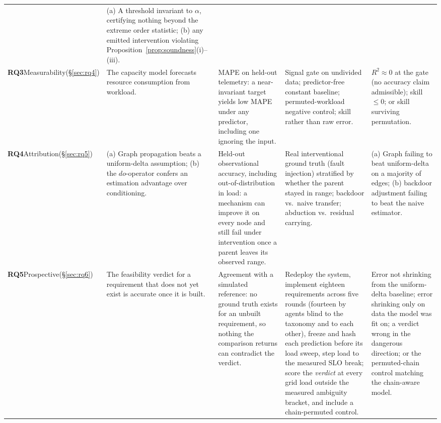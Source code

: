 \documentclass[journal, 10pt]{IEEEtran}
\begin{document}
\begin{table}[!t]
\begin{tabular}{p{1.5cm}p{3.2cm}p{4.2cm}p{3.9cm}p{3.5cm}}
& (a) A threshold invariant to $\alpha$, certifying nothing beyond the extreme order statistic; (b) any emitted intervention violating Proposition~\ref{prop:soundness}(i)--(iii). \\
\addlinespace
\textbf{RQ3}\newline Measurability\newline (\S\ref{sec:rq4})
& The capacity model forecasts resource consumption from workload.
& MAPE on held-out telemetry: a near-invariant target yields low MAPE under any predictor, including one ignoring the input.
& Signal gate on undivided data; predictor-free constant baseline; permuted-workload negative control; skill rather than raw error.
& $R^2\!\approx\!0$ at the gate (no accuracy claim admissible); skill $\leq 0$; or skill surviving permutation. \\
\addlinespace
\textbf{RQ4}\newline Attribution\newline (\S\ref{sec:rq5})
& (a) Graph propagation beats a uniform-delta assumption; (b) the $do$-operator confers an estimation advantage over conditioning.
& Held-out observational accuracy, including out-of-distribution in load: a mechanism can improve it on every node and still fail under intervention once a parent leaves its observed range.
& Real interventional ground truth (fault injection) stratified by whether the parent stayed in range; backdoor vs.\ naive transfer; abduction vs.\ residual carrying.
& (a) Graph failing to beat uniform-delta on a majority of edges; (b) backdoor adjustment failing to beat the naive estimator. \\
\addlinespace
\textbf{RQ5}\newline Prospective\newline (\S\ref{sec:rq6})
& The feasibility verdict for a requirement that does not yet exist is accurate once it is built.
& Agreement with a simulated reference: no ground truth exists for an unbuilt requirement, so nothing the comparison returns can contradict the verdict.
& Redeploy the system, implement eighteen requirements across five rounds (fourteen by agents blind to the taxonomy and to each other), freeze and hash each prediction before its load sweep, step load to the measured SLO break; score the \emph{verdict} at every grid load outside the measured ambiguity bracket, and include a chain-permuted control.
& Error not shrinking from the uniform-delta baseline; error shrinking only on data the model was fit on; a verdict wrong in the dangerous direction; or the permuted-chain control matching the chain-aware model. \\

\end{tabular}
\end{table}
\end{document}
